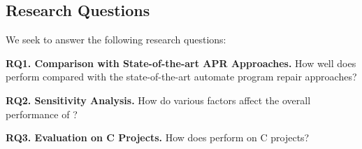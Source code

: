\subsection{Research Questions}

We seek to answer the following research questions:

\noindent\textbf{RQ1. Comparison with State-of-the-art APR Approaches.}  How well does {\tool} perform compared with the state-of-the-art automate program repair approaches?


\noindent\textbf{RQ2. Sensitivity Analysis.} How do various factors affect the overall performance of {\tool}?


\noindent\textbf{RQ3. Evaluation on C Projects.} How does {\tool} perform on C projects?